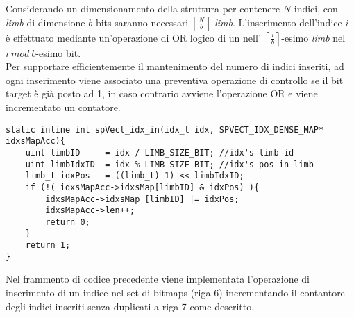 Considerando un dimensionamento della struttura per contenere $N$ indici, con \emph{limb} di dimensione $b$ bits
saranno necessari $\left\lceil \frac{N}{b}  \right\rceil$ \emph{limb}.
L'inserimento dell'indice $i$ è effettuato mediante un'operazione di OR logico di un  nell'
$\left\lceil \frac{i}{b}  \right\rceil$-esimo \emph{limb} nel $i ~mod~ b$-esimo bit.\\
Per supportare efficientemente il mantenimento del numero di indici inseriti, ad ogni inserimento 
viene associato una preventiva operazione di controllo se il bit target è già posto ad 1,
in caso contrario avviene l'operazione OR e viene incrementato un contatore.\\
\begin{lstlisting}
static inline int spVect_idx_in(idx_t idx, SPVECT_IDX_DENSE_MAP* idxsMapAcc){
	uint limbID 	= idx / LIMB_SIZE_BIT; //idx's limb id
	uint limbIdxID	= idx % LIMB_SIZE_BIT; //idx's pos in limb
	limb_t idxPos   = ((limb_t) 1) << limbIdxID;
	if (!( idxsMapAcc->idxsMap[limbID] & idxPos) ){
		idxsMapAcc->idxsMap [limbID] |= idxPos;
		idxsMapAcc->len++;
		return 0;
	}
	return 1;
}
\end{lstlisting}
Nel frammento di codice precedente viene implementata l'operazione di inserimento di un indice nel set di bitmaps (riga 6) 
incrementando il contantore degli indici inseriti senza duplicati a riga 7 come descritto.\\


